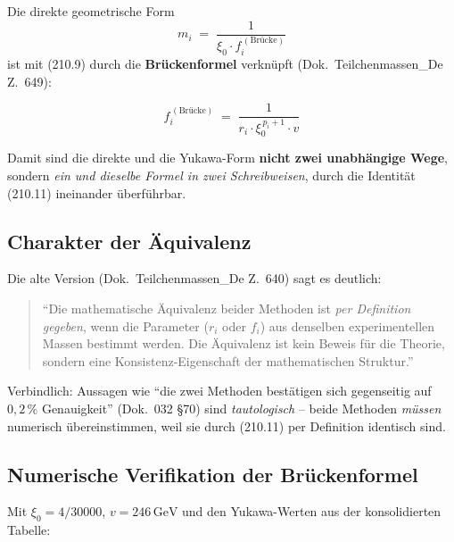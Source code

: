 Die direkte geometrische Form
\begin{equation}
  m_i \;=\; \frac{1}{\xi_0 \cdot f_i^{\,(\text{Brücke})}}
  \tag{210.10}
\end{equation}
ist mit (210.9) durch die \textbf{Brückenformel} verknüpft
(Dok.~Teilchenmassen\_De Z.~649):

\begin{equation}
  \boxed{\;f_i^{\,(\text{Brücke})}
  \;=\; \frac{1}{r_i \cdot \xi_0^{\,p_i+1} \cdot v}\;}
  \tag{210.11}
\end{equation}

Damit sind die direkte und die Yukawa-Form \textbf{nicht zwei
unabhängige Wege}, sondern \emph{ein und dieselbe Formel in zwei
Schreibweisen}, durch die Identität (210.11) ineinander überführbar.

\subsection*{Charakter der Äquivalenz}

Die alte Version (Dok.~Teilchenmassen\_De Z.~640) sagt es deutlich:

\begin{quote}
\enquote{Die mathematische Äquivalenz beider Methoden ist \emph{per
Definition gegeben}, wenn die Parameter ($r_i$ oder $f_i$) aus
denselben experimentellen Massen bestimmt werden. Die Äquivalenz ist
kein Beweis für die Theorie, sondern eine Konsistenz-Eigenschaft der
mathematischen Struktur.}
\end{quote}

Verbindlich: Aussagen wie \enquote{die zwei Methoden bestätigen sich
gegenseitig auf $0{,}2\,\%$ Genauigkeit} (Dok.~032 §70) sind
\emph{tautologisch} -- beide Methoden \emph{müssen} numerisch
übereinstimmen, weil sie durch (210.11) per Definition identisch sind.

\subsection*{Numerische Verifikation der Brückenformel}

Mit $\xi_0 = 4/30000$, $v = 246\,\text{GeV}$ und den Yukawa-Werten
aus der konsolidierten Tabelle:

\begin{center}
{\footnotesize
{}
}
\end{center}

